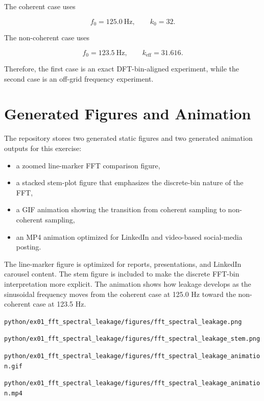 ﻿\documentclass[11pt]{article}
\begin{document}
The coherent case uses

\begin{equation}
f_0 = 125.0~\text{Hz},
\qquad
k_0 = 32.
\end{equation}

The non-coherent case uses

\begin{equation}
f_0 = 123.5~\text{Hz},
\qquad
k_{\text{eff}} = 31.616.
\end{equation}

Therefore, the first case is an exact DFT-bin-aligned experiment, while the second case is an off-grid frequency experiment.

\section{Generated Figures and Animation}

The repository stores two generated static figures and two generated animation outputs for this exercise:

\begin{itemize}
\item a zoomed line-marker FFT comparison figure,
\item a stacked stem-plot figure that emphasizes the discrete-bin nature of the FFT,
\item a GIF animation showing the transition from coherent sampling to non-coherent sampling,
\item an MP4 animation optimized for LinkedIn and video-based social-media posting.
\end{itemize}

The line-marker figure is optimized for reports, presentations, and LinkedIn carousel content. The stem figure is included to make the discrete FFT-bin interpretation more explicit. The animation shows how leakage develops as the sinusoidal frequency moves from the coherent case at 125.0 Hz toward the non-coherent case at 123.5 Hz.

\begin{center}
\texttt{python/ex01\_fft\_spectral\_leakage/figures/fft\_spectral\_leakage.png}

\texttt{python/ex01\_fft\_spectral\_leakage/figures/fft\_spectral\_leakage\_stem.png}

\texttt{python/ex01\_fft\_spectral\_leakage/figures/fft\_spectral\_leakage\_animation.gif}

\texttt{python/ex01\_fft\_spectral\_leakage/figures/fft\_spectral\_leakage\_animation.mp4}
\end{center}
\end{document}
